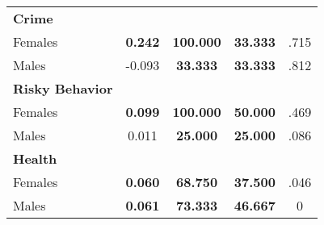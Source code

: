 \begin{tabular}{l c c c c}
\midrule
\textbf{Crime} & & & & \\
\quad Females &  \textbf{    0.242} & \textbf{  100.000} & \textbf{   33.333} & .715 \\
\quad Males &     -0.093 & \textbf{   33.333} & \textbf{   33.333} & .812 \\
\midrule
\textbf{Risky Behavior} & & & & \\
\quad Females &  \textbf{    0.099} & \textbf{  100.000} & \textbf{   50.000} & .469 \\
\quad Males &      0.011 & \textbf{   25.000} & \textbf{   25.000} & .086 \\
\midrule
\textbf{Health} & & & & \\
\quad Females &  \textbf{    0.060} & \textbf{   68.750} & \textbf{   37.500} & .046 \\
\quad Males &  \textbf{    0.061} & \textbf{   73.333} & \textbf{   46.667} & 0 \\
\bottomrule
\end{tabular}
